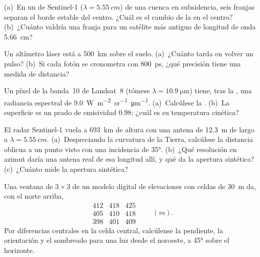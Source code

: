 \begin{exercise}[$\star$]\label{exo:b3:remote-sensing-gis:3}
(a)~En un  de Sentinel-1 ($\lambda = \qty{5.55}{cm}$) de una
cuenca en subsidencia, seis franjas separan el borde estable del centro.
¿Cuál es el cambio de la  en el centro? (b)~¿Cuánto valdría una
franja para un satélite más antiguo de longitud de onda \qty{5.66}{cm}?
\end{exercise}

\begin{exercise}[$\star$]\label{exo:b3:remote-sensing-gis:4}
Un altímetro láser está a \qty{500}{km} sobre el suelo. (a)~¿Cuánto tarda en volver
un pulso? (b)~Si cada fotón se cronometra con \qty{800}{ps}, ¿qué precisión tiene
una medida de distancia?
\end{exercise}

\begin{exercise}[$\star\star$]\label{exo:b3:remote-sensing-gis:5}
Un píxel de la banda~10 de Landsat~8 (tómese $\lambda = \qty{10.9}{\micro\metre}$)
tiene, tras la , una radiancia espectral de
\qty{9.0}{W.m^{-2}.sr^{-1}.\micro\metre^{-1}}. (a)~Calcúlese la
. (b)~La superficie es un prado de emisividad 0.98: ¿cuál es
su temperatura cinética?
\end{exercise}

\begin{exercise}[$\star\star$]\label{exo:b3:remote-sensing-gis:6}
El radar Sentinel-1 vuela a \qty{693}{km} de altura con una antena de \qty{12.3}{m}
de largo a $\lambda = \qty{5.55}{cm}$. (a)~Despreciando la curvatura de la
Tierra, calcúlese la distancia oblicua a un punto visto con una incidencia de
\ang{35}. (b)~¿Qué resolución en azimut daría una antena real de esa longitud
allí, y qué da la apertura sintética? (c)~¿Cuánto mide la
apertura sintética?
\end{exercise}

\begin{exercise}[$\star\star$]\label{exo:b3:remote-sensing-gis:7}
Una ventana de $3\times3$ de un modelo digital de elevaciones con celdas de \qty{30}{m}
da, con el norte arriba,
\[
\begin{matrix} 412 & 418 & 425 \\ 405 & 410 & 418 \\ 398 & 401 & 409 \end{matrix}
\qquad (\unit{m}).
\]
Por diferencias centrales en la celda central, calcúlense la pendiente, la orientación
y el sombreado para una luz desde el noroeste, a \ang{45} sobre el
horizonte.
\end{exercise}

